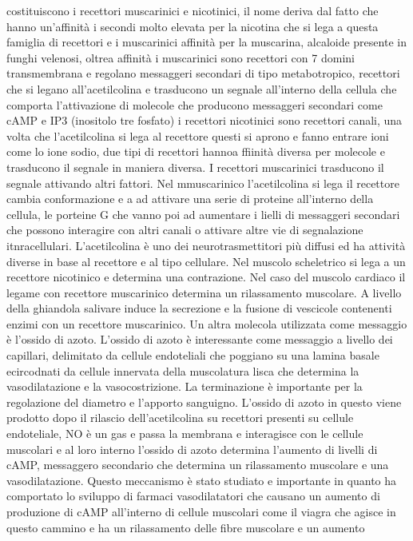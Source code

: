 costituiscono i recettori muscarinici e nicotinici, il nome deriva dal fatto che hanno un'affinit\`a i secondi molto elevata per la nicotina che si lega a questa famiglia di recettori e 
i muscarinici affinit\`a per la muscarina, alcaloide presente in funghi velenosi, oltrea affinit\`a i muscarinici sono recettori con 7 domini transmembrana e regolano messaggeri secondari
di tipo metabotropico, recettori che si legano all'acetilcolina e trasducono un segnale all'interno della cellula che comporta l'attivazione di molecole che producono messaggeri 
secondari come cAMP e IP3 (inositolo tre fosfato) i recettori nicotinici sono recettori canali, una volta che l'acetilcolina si lega al recettore questi si aprono e fanno entrare ioni
come lo ione sodio, due tipi di recettori hannoa ffiinit\`a diversa per molecole e trasducono il segnale in maniera diversa. I recettori muscarinici trasducono il segnale attivando altri
fattori. Nel mmuscarinico l'acetilcolina si lega il recettore cambia conformazione e a ad attivare una serie di proteine all'interno della cellula, le porteine G che vanno poi ad 
aumentare i lielli di messaggeri secondari che possono interagire con altri canali o attivare altre vie di segnalazione itnracellulari. L'acetilcolina \`e uno dei neurotrasmettitori
pi\`u diffusi ed ha attivit\`a diverse in base al recettore e al tipo cellulare. Nel muscolo scheletrico  si lega a un recettore nicotinico e determina una contrazione. Nel caso del
muscolo cardiaco il legame con recettore muscarinico determina un rilassamento muscolare. A livello della ghiandola salivare induce la secrezione e la fusione di vescicole contenenti 
enzimi con un recettore muscarinico. Un altra molecola utilizzata come messaggio \`e l'ossido di azoto. L'ossido di azoto \`e interessante come messaggio a livello dei capillari, 
delimitato da cellule endoteliali che poggiano su una lamina basale ecircodnati da cellule innervata della muscolatura lisca che determina la vasodilatazione e la vasocostrizione. La
terminazione \`e importante per la regolazione del diametro e l'apporto sanguigno. L'ossido di azoto in questo viene prodotto dopo il rilascio dell'acetilcolina su recettori presenti su
cellule endoteliale, NO \`e un gas e passa la membrana e interagisce con le cellule muscolari e al loro interno l'ossido di azoto determina l'aumento di livelli di cAMP, messaggero 
secondario che determina un rilassamento muscolare e una vasodilatazione. Questo meccanismo \`e stato studiato e importante in quanto ha comportato lo sviluppo di farmaci vasodilatatori
che causano un aumento di produzione di cAMP all'interno di cellule muscolari come il viagra che agisce in questo cammino e ha un rilassamento delle fibre muscolare e un aumento 
